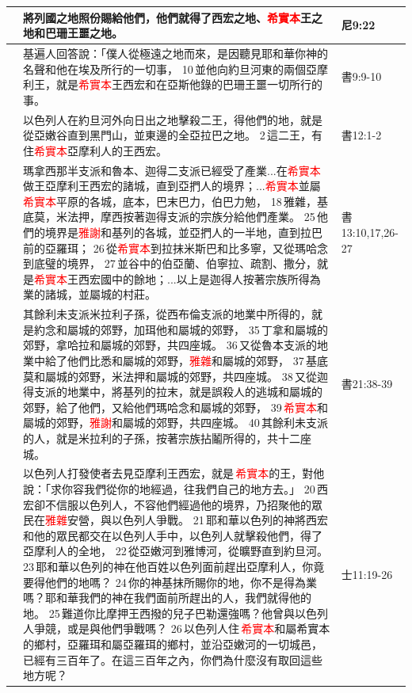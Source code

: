 \begin{table}[H]
\centering 
\begin{tabular}{p{}|p{14cm}|p{1.5cm}}\hline\hline
&將列國之地照份賜給他們，他們就得了西宏之地、\textcolor{red}{希實本}王之地和巴珊王噩之地。&尼9:22\\\hline
&基遍人回答說：「僕人從極遠之地而來，是因聽見耶和華你神的名聲和他在埃及所行的一切事， 10 並他向約旦河東的兩個亞摩利王，就是\textcolor{red}{希實本}王西宏和在亞斯他錄的巴珊王噩一切所行的事。&書9:9-10\\\hline
&以色列人在約旦河外向日出之地擊殺二王，得他們的地，就是從亞嫩谷直到黑門山，並東邊的全亞拉巴之地。 2 這二王，有住\textcolor{red}{希實本}亞摩利人的王西宏。&書12:1-2\\\hline
&瑪拿西那半支派和魯本、迦得二支派已經受了產業...在\textcolor{red}{希實本}做王亞摩利王西宏的諸城，直到亞捫人的境界；...\textcolor{red}{希實本}並屬\textcolor{red}{希實本}平原的各城，底本，巴末巴力，伯巴力勉， 18 雅雜，基底莫，米法押，摩西按著迦得支派的宗族分給他們產業。 25 他們的境界是\textcolor{red}{雅謝}和基列的各城，並亞捫人的一半地，直到拉巴前的亞羅珥； 26 從\textcolor{red}{希實本}到拉抹米斯巴和比多寧，又從瑪哈念到底璧的境界， 27 並谷中的伯亞蘭、伯寧拉、疏割、撒分，就是\textcolor{red}{希實本}王西宏國中的餘地；...以上是迦得人按著宗族所得為業的諸城，並屬城的村莊。&書13:10,17,26-27\\\hline
&其餘利未支派米拉利子孫，從西布倫支派的地業中所得的，就是約念和屬城的郊野，加珥他和屬城的郊野， 35 丁拿和屬城的郊野，拿哈拉和屬城的郊野，共四座城。 36 又從魯本支派的地業中給了他們比悉和屬城的郊野，\textcolor{red}{雅雜}和屬城的郊野， 37 基底莫和屬城的郊野，米法押和屬城的郊野，共四座城。 38 又從迦得支派的地業中，將基列的拉末，就是誤殺人的逃城和屬城的郊野，給了他們，又給他們瑪哈念和屬城的郊野， 39 \textcolor{red}{希實本}和屬城的郊野，\textcolor{red}{雅謝}和屬城的郊野，共四座城。 40 其餘利未支派的人，就是米拉利的子孫，按著宗族拈鬮所得的，共十二座城。&書21:38-39\\\hline
&以色列人打發使者去見亞摩利王西宏，就是 \textcolor{red}{希實本}的王，對他說：「求你容我們從你的地經過，往我們自己的地方去。」 20 西宏卻不信服以色列人，不容他們經過他的境界，乃招聚他的眾民在\textcolor{red}{雅雜}安營，與以色列人爭戰。 21 耶和華以色列的神將西宏和他的眾民都交在以色列人手中，以色列人就擊殺他們，得了亞摩利人的全地， 22 從亞嫩河到雅博河，從曠野直到約旦河。 23 耶和華以色列的神在他百姓以色列面前趕出亞摩利人，你竟要得他們的地嗎？ 24 你的神基抹所賜你的地，你不是得為業嗎？耶和華我們的神在我們面前所趕出的人，我們就得他的地。 25 難道你比摩押王西撥的兒子巴勒還強嗎？他曾與以色列人爭競，或是與他們爭戰嗎？ 26 以色列人住 \textcolor{red}{希實本}和屬希實本的鄉村，亞羅珥和屬亞羅珥的鄉村，並沿亞嫩河的一切城邑，已經有三百年了。在這三百年之內，你們為什麼沒有取回這些地方呢？&士11:19-26\\\hline

\end{tabular}
\end{table}
